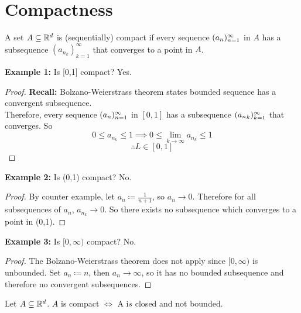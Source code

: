 \documentclass[openany]{report}
\begin{document}
\chapter{Compactness}
\begin{definition}
    A set $A \subseteq \mathbb{R}^d$ is (sequentially) compact if every sequence $({a}_n)_{n=1}^\infty$ in $A$ has a subsequence $(a_{n_k})^\infty_{k = 1}$ that converges to a point in $A$.
\end{definition}
\textbf{Example 1:} Is [0,1] compact? Yes.
\begin{proof}
    \textbf{Recall:} Bolzano-Weierstrass theorem states bounded sequence has a convergent subsequence. \\[1ex]
    Therefore, every sequence $({a}_n)_{n=1}^\infty$ in $[0,1]$ has a subsequence $({a_n}_{k})^{\infty}_{k = 1}$ that converges. So
    $$0 \leq a_{n_k} \leq 1 \implies 0 \leq \lim_{k \rightarrow \infty} a_{n_k} \leq 1$$
    $$\therefore L \in [0,1]$$
\end{proof}
\textbf{Example 2:} Is (0,1) compact? No.
\begin{proof}
    By counter example, let $a_n \coloneqq \frac{1}{n+1}$, so $a_n \rightarrow 0$. Therefore
    for all subsequences of $a_n$, $a_{n_k} \rightarrow 0$. So there exists no subsequence which converges
    to a point in (0,1).
\end{proof}
\textbf{Example 3:} Is $[0,\infty)$ compact? No.
\begin{proof}
    The Bolzano-Weierstrass theorem does not apply since $[0,\infty)$ is unbounded.
    Set $a_n \coloneqq n$, then $a_n \rightarrow \infty$, so it has no bounded subsequence
    and therefore no convergent subsequences.
\end{proof}
\begin{theorem}
    Let $A \subseteq \mathbb{R}^d$. $A$ is compact $\iff$ A i$s$ closed and not bounded.
\end{theorem}
\end{document}
